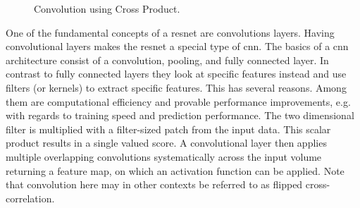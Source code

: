 \begin{figure}[hbt]
    \centering
    
    \caption[Convolution]{Convolution using Cross Product. \cite{user194703.2019}}
    \label{fig:convolution}
\end{figure}
One of the fundamental concepts of a \acrshort{resnet} are convolutions layers. Having convolutional layers makes the \acrshort{resnet} a special type of \acrshort{cnn}. The basics of a \acrshort{cnn} architecture consist of a convolution, pooling, and fully connected layer. In contrast to fully connected layers they look at specific features instead and use filters (or kernels) to extract specific features. This has several reasons. Among them are computational efficiency and provable performance improvements, e.g. with regards to training speed and prediction performance. \cite{Goodfellow.2016} The two dimensional filter is multiplied with a filter-sized patch from the input data. This scalar product results in a single valued score. A convolutional layer then applies multiple overlapping convolutions systematically across the input volume returning a feature map, on which an activation function can be applied. Note that convolution here may in other contexts be referred to as flipped cross-correlation. \cite{Goodfellow.2016}

